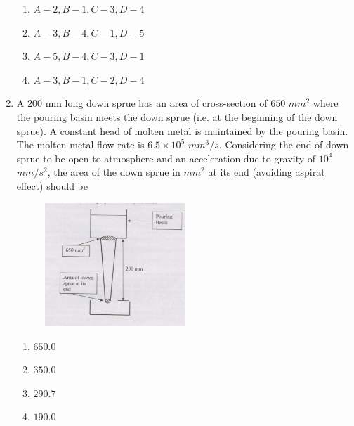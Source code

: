 \documentclass[journal]{IEEEtran}
\begin{document}
\begin{enumerate}[start = 52]
      \begin{multicols}{2}
        \begin{enumerate}
            \item $A-2,B-1,C-3,D-4$
            \item $A-3,B-4,C-1,D-5$
            \item $A-5,B-4,C-3,D-1$
            \item $A-3,B-1,C-2,D-4$
        \end{enumerate}
    \end{multicols}

    \item A $200$ mm long down sprue has an area of cross-section of $650$ $mm^2$ where the pouring basin meets the down sprue (i.e. at the beginning of the down sprue). A constant head of molten metal is maintained by the pouring basin. The molten metal flow rate is $6.5 \times 10^5$ $mm^{3}/s$. Considering the end of down sprue to be open to atmosphere and an acceleration due to gravity of $10^4$ $mm/s^2$, the area of the down sprue in $mm^2$ at its end (avoiding aspirat effect) should be
    \begin{figure}[h]
    \centering
    \includegraphics[width=0.5\textwidth]{fig2.png} 
    \end{figure}

     \begin{multicols}{4}
        \begin{enumerate}
            \item $650.0$
            \item $350.0$
            \item $290.7$
            \item $190.0$
        \end{enumerate}
    \end{multicols}


\end{enumerate}
\end{document}
